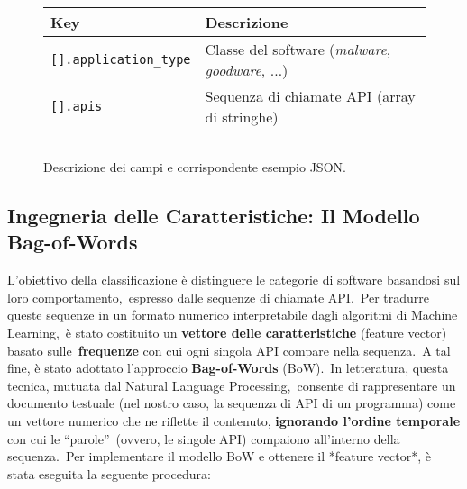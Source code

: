 \begin{figure}[h!]
    \centering
    \renewcommand{\arraystretch}{1.3}
    \begin{tabular}{p{} p{}}
        \toprule
        \textbf{Key}                  & \textbf{Descrizione}                                           \\
        \midrule
        \texttt{[].application\_type} & Classe del software (\emph{malware}, \emph{goodware}, $\dots$) \\
        \texttt{[].apis}              & Sequenza di chiamate API (array di stringhe)                   \\
        \bottomrule
    \end{tabular}

    \vspace{4mm} %

    \inputminted[fontsize=\small]{json}{approccio-proposto/example.json}
    \caption{Descrizione dei campi e corrispondente esempio JSON.}
    \label{fig:json-struct}
\end{figure}

\subsection{Ingegneria delle Caratteristiche: Il Modello Bag-of-Words}

L'obiettivo della classificazione è distinguere le categorie di software basandosi sul loro comportamento,\
espresso dalle sequenze di chiamate API.\
Per tradurre queste sequenze in un formato numerico interpretabile dagli algoritmi di Machine Learning,\
è stato costituito un \textbf{vettore delle caratteristiche} (feature vector) basato sulle\
\textbf{frequenze} con cui ogni singola API compare nella sequenza.\
A tal fine, è stato adottato l'approccio \textbf{Bag-of-Words} (BoW).\
In letteratura, questa tecnica, mutuata dal Natural Language Processing,\
consente di rappresentare un documento testuale (nel nostro caso, la sequenza di API di un programma)
come un vettore numerico che ne riflette il contenuto, \textbf{ignorando l'ordine temporale} con cui le ``parole''\
(ovvero, le singole API) compaiono all'interno della sequenza.\
Per implementare il modello BoW e ottenere il *feature vector*, è stata eseguita la seguente procedura:

